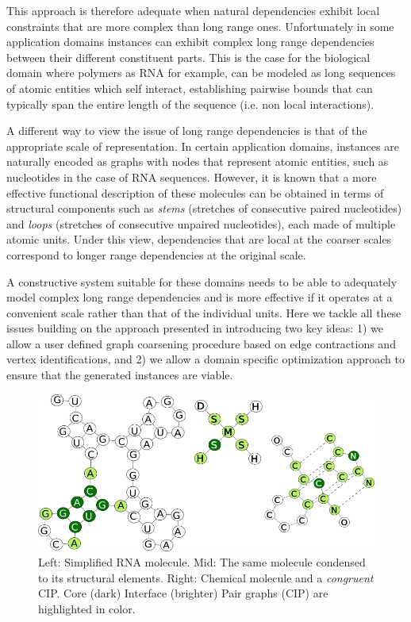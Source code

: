 \documentclass{article}
\begin{document}
This approach is therefore adequate when natural dependencies exhibit local
constraints that are more complex than long range ones.  Unfortunately in
some application domains instances can exhibit complex long range
dependencies between their different constituent parts. This is the case for
the biological domain where polymers as RNA for example, can be modeled as
long sequences of atomic entities which self interact, establishing pairwise
bounds that can typically span the entire length of the sequence (i.e. non
local interactions).

A different way to view the issue of long range dependencies is that of the
appropriate scale of representation. In certain application domains, instances
are naturally encoded as graphs with nodes that represent atomic entities,
such as nucleotides in the case of RNA sequences. However, it is known that a
more effective functional description of these molecules can be obtained in
terms of structural components such as {\em stems} (stretches of consecutive
paired nucleotides) and {\em loops} (stretches of consecutive unpaired
nucleotides), each made of multiple atomic units. Under this view,
dependencies that are local at the coarser scales correspond to longer range
dependencies at the original scale.

A constructive system suitable for these domains needs to be able to
adequately model complex long range dependencies and is more effective if it
operates at a convenient scale rather than that of the individual units. Here we
tackle all these issues building on the approach presented in \cite{costa16}
introducing two key ideas: 1) we allow a user defined graph coarsening
procedure based on edge contractions and vertex identifications, and 2) we
allow a domain specific optimization approach to ensure that the generated
instances are viable.

%
\begin{figure}[ht]
      \centering
        \includegraphics[width=1.0\linewidth]{images/allcipsinone.png}
      \caption{Left: Simplified RNA molecule. Mid: The same molecule
      condensed to its structural elements. Right: Chemical molecule and a
      \emph{congruent} CIP. Core (dark) Interface (brighter) Pair graphs (CIP)
      are
      highlighted in color.}
      \label{allcips}
\end{figure}
\end{document}
